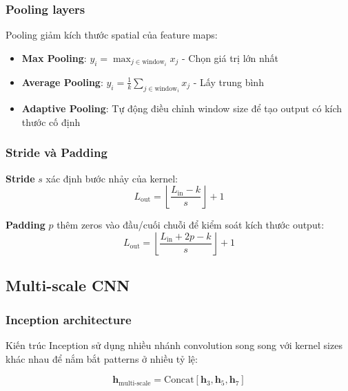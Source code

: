 \subsubsection{Pooling layers}

Pooling giảm kích thước spatial của feature maps:

\begin{itemize}
    \item \textbf{Max Pooling}: $y_i = \max_{j \in \text{window}_i} x_j$ - Chọn giá trị lớn nhất
    \item \textbf{Average Pooling}: $y_i = \frac{1}{k}\sum_{j \in \text{window}_i} x_j$ - Lấy trung bình
    \item \textbf{Adaptive Pooling}: Tự động điều chỉnh window size để tạo output có kích thước cố định
\end{itemize}

\subsubsection{Stride và Padding}

\textbf{Stride} $s$ xác định bước nhảy của kernel:
\begin{equation}
L_{\text{out}} = \left\lfloor \frac{L_{\text{in}} - k}{s} \right\rfloor + 1
\end{equation}

\textbf{Padding} $p$ thêm zeros vào đầu/cuối chuỗi để kiểm soát kích thước output:
\begin{equation}
L_{\text{out}} = \left\lfloor \frac{L_{\text{in}} + 2p - k}{s} \right\rfloor + 1
\end{equation}

\subsection{Multi-scale CNN}

\subsubsection{Inception architecture}

Kiến trúc Inception \cite{szegedy2015going} sử dụng nhiều nhánh convolution song song với kernel sizes khác nhau để nắm bắt patterns ở nhiều tỷ lệ:

\begin{equation}
\mathbf{h}_{\text{multi-scale}} = \text{Concat}[\mathbf{h}_3, \mathbf{h}_5, \mathbf{h}_7]
\end{equation}

